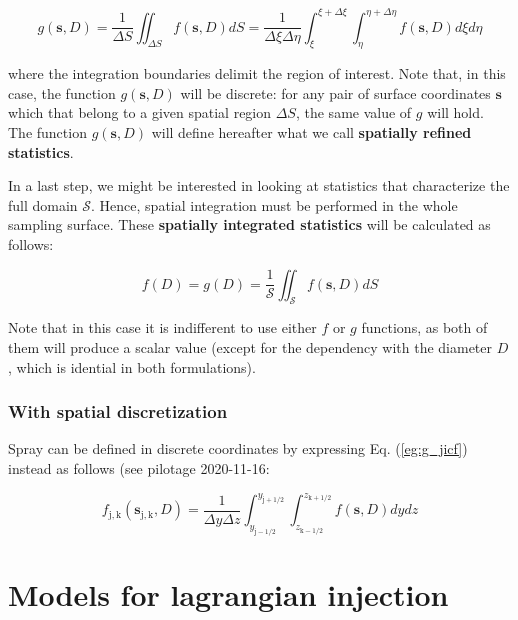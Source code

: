 \begin{equation}
\label{eg:g_general}
g \left( \boldsymbol{s}, D \right) = \frac{1}{\Delta S} \iint_{\Delta S} f \left( \boldsymbol{s}, D \right) dS = \frac{1}{\Delta \xi \Delta \eta} \int_\xi^{\xi + \Delta \xi} \int_\eta^{\eta + \Delta \eta}  f \left( \boldsymbol{s}, D \right) d\xi d\eta
\end{equation}

where the integration boundaries delimit the region of interest. Note that, in this case, the function $g \left( \boldsymbol{s}, D \right)$ will be discrete: for any pair of surface coordinates $\boldsymbol{s}$ which that belong to a given spatial region $\Delta S$, the same value of $g$ will hold. The function $g \left( \boldsymbol{s}, D \right)$ will define hereafter what we call \textbf{spatially refined statistics}.

In a last step, we might be interested in looking at statistics that characterize the full domain $\mathcal{S}$. Hence, spatial integration must be performed in the whole sampling surface. These \textbf{spatially integrated statistics} will be calculated as follows:

\begin{equation}
f \left( D \right) = g \left( D \right) = \frac{1}{\mathcal{S}} \iint_{\mathcal{S}} f \left( \boldsymbol{s}, D \right) dS
\end{equation}

Note that in this case it is indifferent to use either $f$ or $g$ functions, as both of them will produce a scalar value (except for the dependency with the diameter $D$, which is idential in both formulations).

\subsubsection{With spatial discretization}

Spray can be defined in discrete coordinates by expressing Eq. (\ref{eg:g_jicf}) instead as follows (see pilotage 2020-11-16:

\begin{equation}
\label{eg:g_jicf}
f_\mathrm{j,k} \left( \boldsymbol{s}_\mathrm{j,k}, D \right) = \frac{1}{\Delta y \Delta z} \int_{y_\mathrm{j-1/2}}^{y_\mathrm{j+1/2}} \int_{z_\mathrm{k-1/2}}^{z_\mathrm{k+1/2}}  f \left( \boldsymbol{s}, D \right) dy dz
\end{equation}



\section{Models for lagrangian injection}
	\label{sec:ch4_models_flowchart}


